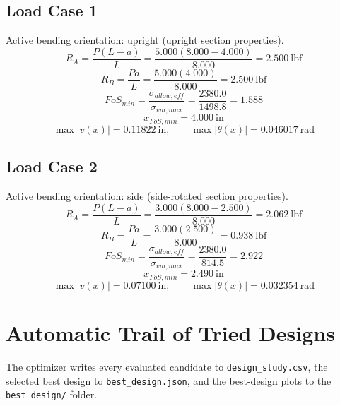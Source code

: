 \documentclass[11pt]{article}
\begin{document}
\subsection*{Load Case 1}
Active bending orientation: upright (upright section properties).
\[R_A = \frac{P(L-a)}{L} = \frac{5.000(8.000-4.000)}{8.000} = 2.500\ \mathrm{lbf}\]
\[R_B = \frac{Pa}{L} = \frac{5.000(4.000)}{8.000} = 2.500\ \mathrm{lbf}\]
\[FoS_{min} = \frac{\sigma_{allow,eff}}{\sigma_{vm,max}} = \frac{2380.0}{1498.8} = 1.588\]
\[x_{FoS,min} = 4.000\ \mathrm{in}\]
\[\max |v(x)| = 0.11822\ \mathrm{in}, \qquad \max |\theta(x)| = 0.046017\ \mathrm{rad}\]
\subsection*{Load Case 2}
Active bending orientation: side (side-rotated section properties).
\[R_A = \frac{P(L-a)}{L} = \frac{3.000(8.000-2.500)}{8.000} = 2.062\ \mathrm{lbf}\]
\[R_B = \frac{Pa}{L} = \frac{3.000(2.500)}{8.000} = 0.938\ \mathrm{lbf}\]
\[FoS_{min} = \frac{\sigma_{allow,eff}}{\sigma_{vm,max}} = \frac{2380.0}{814.5} = 2.922\]
\[x_{FoS,min} = 2.490\ \mathrm{in}\]
\[\max |v(x)| = 0.07100\ \mathrm{in}, \qquad \max |\theta(x)| = 0.032354\ \mathrm{rad}\]

\section*{Automatic Trail of Tried Designs}
The optimizer writes every evaluated candidate to \texttt{design\_study.csv}, the selected best design to \texttt{best\_design.json}, and the best-design plots to the \texttt{best\_design/} folder.
\end{document}
